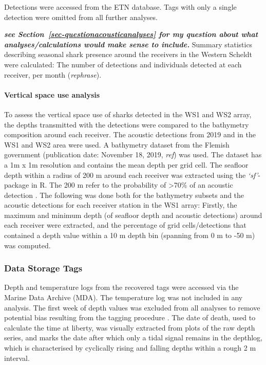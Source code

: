\documentclass[
  authoryear,
  review,
  3p]{elsarticle}
\let\oldparagraph\paragraph
\renewcommand{\paragraph}[1]{\oldparagraph{#1}\mbox{}}
\begin{document}
Detections were accessed from the ETN database. Tags with only a single
detection were omitted from all further analyses.

\textbf{\emph{see Section~\ref{sec-questionacousticanalyses} for my
question about what analyses/calculations would make sense to include.}}
Summary statistics describing seasonal shark presence around the
receivers in the Western Scheldt were calculated: The number of
detections and individuals detected at each receiver, per month
(\emph{rephrase}).

\hypertarget{vertical-space-use-analysis}{%
\paragraph{Vertical space use
analysis}\label{vertical-space-use-analysis}}

To assess the vertical space use of sharks detected in the WS1 and WS2
array, the depths transmitted with the detections were compared to the
bathymetry composition around each receiver. The acoustic detections
from 2019 and in the WS1 and WS2 area were used. A bathymetry dataset
from the Flemish government (publication date: November 18, 2019,
\emph{ref}) was used. The dataset has a 1m x 1m resolution and contains
the mean depth per grid cell. The seafloor depth within a radius of 200
m around each receiver was extracted using the \emph{`sf'}-package in R.
The 200 m refer to the probability of \textgreater70\% of an acoustic
detection \citep{reubens_2019}. The following was done both for the
bathymetry subsets and the acoustic detections for each receiver station
in the WS1 array: Firstly, the maximum and minimum depth (of seafloor
depth and acoustic detections) around each receiver were extracted, and
the percentage of grid cells/detections that contained a depth value
within a 10 m depth bin (spanning from 0 m to -50 m) was computed.

\hypertarget{sec-mm_dsts}{%
\subsubsection{Data Storage Tags}\label{sec-mm_dsts}}

Depth and temperature logs from the recovered tags were accessed via the
Marine Data Archive (MDA). The temperature log was not included in any
analysis. The first week of depth values was excluded from all analyses
to remove potential bias resulting from the tagging procedure
\citep[cf.][]{flavio_2021}. The date of death, used to calculate the
time at liberty, was visually extracted from plots of the raw depth
series, and marks the date after which only a tidal signal remains in
the depthlog, which is characterised by cyclically rising and falling
depths within a rough 2 m interval.
\end{document}
